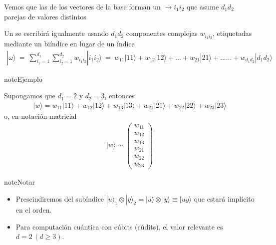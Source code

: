 \documentclass[letterpaper,10pt,english]{jupyterBook}
\newcommand{\ket}[1]{|#1\rangle}
\begin{document}
\sphinxAtStartPar
Vemos que las  de los vectores de la base forman un  \(\to i_1 i_2\) que asume \(d_1 d_2\) parejas de valores distintos

\sphinxAtStartPar
Un  se escribirá igualmente usando \(d_1 d_2\) componentes complejas \(w_{i_1 i_2}\), etiquetadas mediante un bi\sphinxhyphen{}índice en lugar de un índice
\begin{equation*}
\begin{split}
\ket{\omega} ~= ~ \sum_{i_1=1}^{d_1}\sum_{i_2=1}^{d_2} w_{i_1i_2} \ket{i_1 i_2} 
~=~ w_{11}\ket{11} + w_{12}\ket{12} + ... + w_{21}\ket{21} + ...\ldots + w_{d_1 d_2}\ket{d_1 d_2}   
\end{split}
\end{equation*}
\begin{sphinxadmonition}{note}{Ejemplo}

\sphinxAtStartPar
Supongamos que \(d_1 = 2\) y \(d_2=3\), entonces
\begin{equation*}
\begin{split}
\ket{w} = w_{11}\ket{11} + w_{12}\ket{12} + w_{13}\ket{13} + w_{21}\ket{21} + w_{22}\ket{22} + w_{23}\ket{23}
\end{split}
\end{equation*}
\sphinxAtStartPar
o, en notación matricial
\begin{equation*}
\begin{split}
\ket{w} \sim  \begin{pmatrix} w_{11}\\ w_{12} \\ w_{13} \\ w_{21} \\ w_{22} \\ w_{23} \end{pmatrix}
\end{split}
\end{equation*}\end{sphinxadmonition}

\begin{sphinxadmonition}{note}{Notar}
\begin{itemize}
\item {} 
\sphinxAtStartPar
Prescindiremos del subíndice \(\ket{u}_1\otimes \ket{y}_2=\ket{u}\otimes \ket{y} \equiv \ket{uy}\) que estará implícito en el orden.

\item {} 
\sphinxAtStartPar
Para computación cuántica con cúbits (cúdits), el valor relevante es \(d=2\,(d\geq 3)\).

\end{itemize}
\end{sphinxadmonition}
\end{document}

